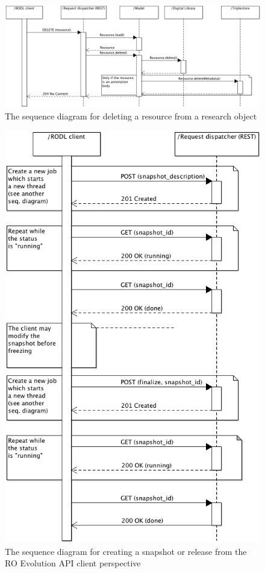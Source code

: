 \begin{figure}[!hb]
\centering
\includegraphics[width=\textwidth]{Figures/RODL/ResourceDelete.png}
\caption{The sequence diagram for deleting a resource from a research object}
\label{ResourceDelete}
\end{figure}

\begin{figure}[!hb]
\centering
\includegraphics[width=\textwidth]{Figures/RODL/SnapshotClient.png}
\caption{The sequence diagram for creating a snapshot or release from the RO Evolution API client perspective}
\label{SnapshotClient}
\end{figure}

